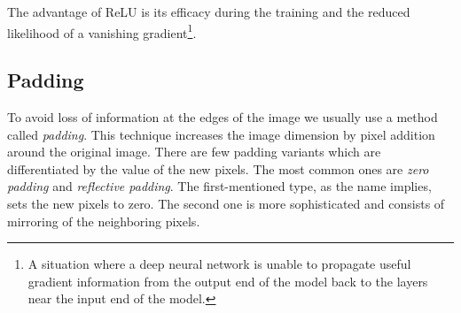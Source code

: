 The advantage of ReLU is its efficacy during the training and the reduced likelihood of a vanishing
gradient\footnote{\label{foot:vangrad}A situation where a deep neural network is unable to propagate useful gradient
information from the output end of the model back to the layers near the input end of the model.}.

\subsection{Padding}\label{subsec:padding}
To avoid loss of information at the edges of the image we usually use a method called \textit{padding}.
This technique increases the image dimension by pixel addition around the original image.
There are few padding variants which are differentiated by the value of the new pixels.
The most common ones are \textit{zero padding} and \textit{reflective padding}.
The first-mentioned type, as the name implies, sets the new pixels to zero.
The second one is more sophisticated and consists of mirroring of the neighboring pixels.

